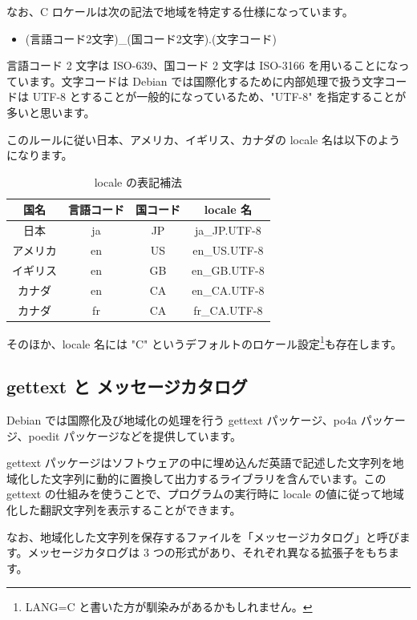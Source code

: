 \documentclass[mingoth,a4paper]{jsarticle}
\begin{document}
なお、C ロケールは次の記法で地域を特定する仕様になっています。

\begin{itemize}
\item (言語コード2文字)\_(国コード2文字).(文字コード)
\end{itemize}

言語コード 2 文字は ISO-639、国コード 2 文字は ISO-3166 を用いることになっています。文字コードは Debian では国際化するために内部処理で扱う文字コードは UTF-8 とすることが一般的になっているため、"UTF-8" を指定することが多いと思います。

このルールに従い日本、アメリカ、イギリス、カナダの locale 名は以下のようになります。

\begin{table}[hbtp]
  \caption{locale の表記補法}
  \label{table:locale_display}
  \centering
  \begin{tabular}{cccc}
    \hline
    国名 & 言語コード & 国コード & locale 名 \\
    \hline
    日本 & ja & JP & ja\_JP.UTF-8 \\
    アメリカ & en & US & en\_US.UTF-8 \\
    イギリス & en & GB & en\_GB.UTF-8 \\
    カナダ & en & CA & en\_CA.UTF-8 \\
    カナダ & fr & CA & fr\_CA.UTF-8 \\
    \hline
  \end{tabular}
\end{table}

そのほか、locale 名には "C" というデフォルトのロケール設定\footnote{LANG=C と書いた方が馴染みがあるかもしれません。}も存在します。

\subsection{gettext と メッセージカタログ}

Debian では国際化及び地域化の処理を行う gettext パッケージ、po4a パッケージ、poedit パッケージなどを提供しています。

gettext パッケージはソフトウェアの中に埋め込んだ英語で記述した文字列を地域化した文字列に動的に置換して出力するライブラリを含んでいます。この gettext の仕組みを使うことで、プログラムの実行時に locale の値に従って地域化した翻訳文字列を表示することができます。


なお、地域化した文字列を保存するファイルを「メッセージカタログ」と呼びます。メッセージカタログは 3 つの形式があり、それぞれ異なる拡張子をもちます。
\end{document}
